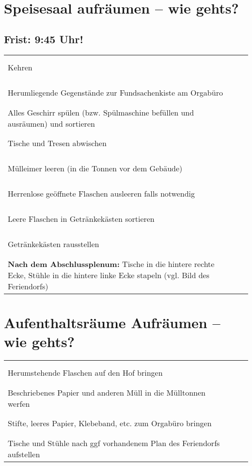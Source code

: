 \documentclass[14pt,parskip=full+]{scrartcl}
\newcommand{\checkfield}{~ \hfill ~\raisebox{-5pt}{\tikz\node[draw,minimum width=16.8pt,minimum height=16.8pt]{};}}
\begin{document}
\parbox[t]{.8\textwidth}{\vskip0pt
\section*{Speisesaal aufr\"aumen -- wie gehts?}
\subsection*{Frist: 9:45 Uhr!}
}

\bigskip

\def\arraystretch{1.3}

\begin{tabularx}{\textwidth}{Xc}
 Kehren & \checkfield \\
 Herumliegende Gegenstände zur Fundsachenkiste am Orgabüro & \checkfield \\
 Alles Geschirr spülen (bzw. Spülmaschine befüllen und ausräumen) und sortieren & \checkfield \\
 Tische und Tresen abwischen & \checkfield \\
 M\"ulleimer leeren (in die Tonnen vor dem Gebäude) & \checkfield \\
 Herrenlose ge\"offnete Flaschen ausleeren falls notwendig & \checkfield \\
 Leere Flaschen in Getr\"ankek\"asten sortieren & \checkfield \\
 Getr\"ankek\"asten rausstellen & \checkfield \\
 \textbf{Nach dem Abschlussplenum:} Tische in die hintere rechte Ecke, St\"uhle in die hintere linke Ecke stapeln (vgl. Bild des Feriendorfs)& \checkfield
\end{tabularx}





\vspace{2cm}

\parbox[t]{.8\textwidth}{\vskip0pt
  \section*{Aufenthaltsräume Aufr\"aumen -- wie gehts?}
}

\bigskip

\def\arraystretch{1.3}

\begin{tabularx}{\textwidth}{Xc}
  Herumstehende Flaschen auf den Hof bringen & \checkfield \\
  Beschriebenes Papier und anderen Müll in die Mülltonnen werfen & \checkfield \\
  Stifte, leeres Papier, Klebeband, etc. zum Orgabüro bringen & \checkfield \\
  Tische und Stühle nach ggf vorhandenem Plan des Feriendorfs aufstellen & \checkfield \\
\end{tabularx}
\end{document}
